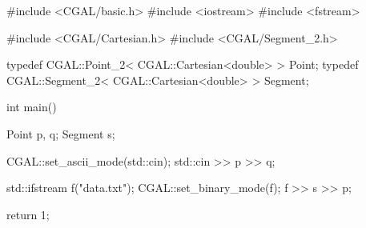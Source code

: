 \begin{cprog}

#include <CGAL/basic.h>
#include <iostream>
#include <fstream>

#include <CGAL/Cartesian.h>
#include <CGAL/Segment_2.h>

typedef CGAL::Point_2< CGAL::Cartesian<double> >     Point;
typedef CGAL::Segment_2< CGAL::Cartesian<double> >   Segment;

int
main()
{
    Point p, q;
    Segment s;

    CGAL::set_ascii_mode(std::cin);
    std::cin >> p >> q;

    std::ifstream f("data.txt");
    CGAL::set_binary_mode(f);
    f >> s >> p;

    return 1;
}
\end{cprog} 



